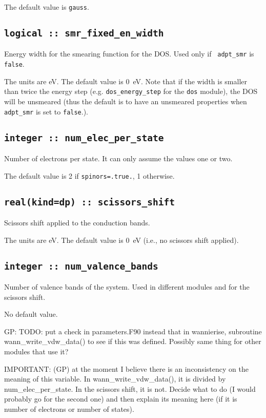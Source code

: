 The default value is {\tt gauss}.

\subsection[smr\_en\_width]{\tt logical :: smr\_fixed\_en\_width}
Energy width for the smearing function for the DOS. Used only if {\tt
  adpt\_smr} is \verb#false#.

The units are eV. The default value is 0~eV. Note that if the width is
smaller than twice the energy step (e.g. {\tt dos\_energy\_step} for
the {\tt dos} module), the DOS
will be unsmeared (thus the default is to have an unsmeared
properties when {\tt  adpt\_smr} is set to \verb#false#.).


  \subsection{\tt integer :: num\_elec\_per\_state} 
Number of electrons per state. It can only assume the values one or
two.

The default value is 2 if {\tt spinors=.true.}, 1 otherwise.

  \subsection{\tt real(kind=dp) :: scissors\_shift} 
Scissors shift applied to the conduction bands.

The units are eV. The default value is 0~eV (i.e., no scissors shift applied).

  \subsection{\tt integer :: num\_valence\_bands} 
Number of valence bands of the system. Used in different modules and
for the scissors shift.

No default value.

{\color{red}
GP: TODO: put a check in parameters.F90  instead that in wannierise,
subroutine
wann\_write\_vdw\_data() to see if this was defined. Possibly same thing
for other modules that use it?

IMPORTANT: (GP) at the moment I believe there is an inconsistency on the
meaning of this variable. In wann\_write\_vdw\_data(), it is divided by
num\_elec\_per\_state. In the scissors shift, it is not. Decide what to
do (I would probably go for the second one) and then explain its
meaning here (if it is number of electrons or number of states).
}


